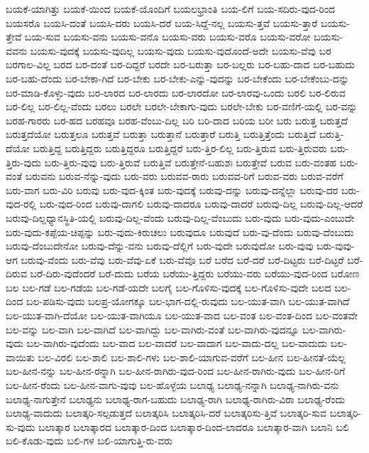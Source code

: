 {ಬಯಕೆ-ಯಾಗಿತ್ತು
ಬಯಕೆ-ಯಿಂದ
ಬಯಕೆ-ಯೊಂದಿಗೆ
ಬಯಲಭ್ರಾಂತಿ
ಬಯ-ಲಿಗೆ
ಬಯ-ಸದಿರು-ವುದ-ರಿಂದ
ಬಯಸರೊ
ಬಯಸಿ-ದಂತೆ
ಬಯಸಿ-ದರು
ಬಯಸಿ-ದರೆ
ಬಯ-ಸಿದ್ದೆ-ನಲ್ಲ
ಬಯಸು-ತ್ತವೆ
ಬಯಸು-ತ್ತಾರೆ
ಬಯಸು-ತ್ತೇವೆ
ಬಯ-ಸುವ
ಬಯಸು-ವನು
ಬಯಸು-ವನೊ
ಬಯಸು-ವರು
ಬಯಸು-ವರೊ
ಬಯಸು-ವರೋ
ಬಯಸು-ವವನು
ಬಯಸು-ವುದಕ್ಕೆ
ಬಯಸು-ವುದಿಲ್ಲ
ಬಯಸು-ವುದು
ಬಯಸು-ವುದೊಂದೆ-ಅದೇ
ಬಯಸು-ವೆವು
ಬರ
ಬರಗಾಲ-ವಿಲ್ಲ
ಬರದ
ಬರ-ದಂತೆ
ಬರ-ದಿದ್ದರೆ
ಬರದೇ
ಬರ-ಬರುತ್ತಾ
ಬರ-ಬಲ್ಲರು
ಬರ-ಬಹು-ದಾದ
ಬರ-ಬಹುದು
ಬರ-ಬಹು-ದೆಂದು
ಬರ-ಬೇಕಾ-ಗಿದೆ
ಬರ-ಬೇಕು
ಬರ-ಬೇಕು-ಎನ್ನು-ವುದನ್ನು
ಬರ-ಬೇಕೆಂದು
ಬರ-ಬೇಕೆಂಬು-ದನ್ನು
ಬರ-ಮಾಡಿ-ಕೊಳ್ಳು-ವುದು
ಬರ-ಲಾರದ
ಬರ-ಲಾರದು
ಬರ-ಲಾರದೋ
ಬರ-ಲಾರವು-ಒಂದು
ಬರಲಿ
ಬರ-ಲಿರುವ
ಬರ-ಲಿಲ್ಲ
ಬರ-ಲಿಲ್ಲ-ವೆಂದು
ಬರಲು
ಬರಲೇ
ಬರಲೇ-ಬೇಕಾಗು-ವುದು
ಬರಲೇ-ಬೇಕು
ಬರ-ವಣಿಗೆ-ಯಲ್ಲಿ
ಬರ-ವನ್ನು
ಬರಹ-ಗಾರರು
ಬರ-ಹದ
ಬರಹವೂ
ಬರಹ-ವೆಂಬು-ದಿಲ್ಲ
ಬರಿ
ಬರಿ-ದಾದ
ಬರಿಯ
ಬರೀ
ಬರು
ಬರುತ್ತ
ಬರುತ್ತದೆ
ಬರುತ್ತದೆಯೋ
ಬರುತ್ತಲೂ
ಬರುತ್ತವೆ
ಬರುತ್ತಾ
ಬರುತ್ತಾನೆ
ಬರುತ್ತಾರೆ
ಬರುತ್ತಿ
ಬರುತ್ತಿತ್ತೆಂದು
ಬರುತ್ತಿದೆ
ಬರುತ್ತಿ-ದೆಯೋ
ಬರುತ್ತಿದ್ದ
ಬರುತ್ತಿದ್ದರು
ಬರುತ್ತಿದ್ದರೂ
ಬರುತ್ತಿದ್ದರೆ
ಬರು-ತ್ತಿರ-ಲಿಲ್ಲ
ಬರು-ತ್ತಿರುವ
ಬರು-ತ್ತಿರುವರು
ಬರು-ತ್ತಿರು-ವುದು
ಬರು-ತ್ತಿರು-ವುವು
ಬರು-ತ್ತಿರುವೆ
ಬರುತ್ತಿವೆ
ಬರುತ್ತೇನೆ-ಬಹುಶಃ
ಬರುತ್ತೇವೆ
ಬರುವ
ಬರು-ವಂತಹ
ಬರು-ವಂತೆ
ಬರುವನು
ಬರುವ-ನೆನ್ನು-ವುದು
ಬರು-ವರು
ಬರುವವ-ರಾರು
ಬರುವವ-ರಿಗೆ
ಬರುವ-ವರು
ಬರುವ-ವರೆಗೆ
ಬರು-ವಾಗ
ಬರು-ವಿರಿ
ಬರುವು
ಬರು-ವುದ-ಕ್ಕಿಂತ
ಬರು-ವುದಕ್ಕೆ
ಬರುವು-ದನ್ನು
ಬರುವು-ದನ್ನೆಲ್ಲಾ
ಬರುವು-ದರ
ಬರು-ವುದ-ರಲ್ಲಿ
ಬರು-ವುದ-ರಿಂದ
ಬರುವು-ದಾಗಲಿ
ಬರುವು-ದಾದರೂ
ಬರುವು-ದಾದರೆ
ಬರುವು-ದಿಲ್ಲ
ಬರುವು-ದಿಲ್ಲ-ಆದರೆ
ಬರುವು-ದಿಲ್ಲಧ್ಯಾನಸ್ಥಿತಿ-ಯಲ್ಲಿ
ಬರುವು-ದಿಲ್ಲ-ವೆಂದು
ಬರುವು-ದಿಲ್ಲ-ವೆಂಬುದು
ಬರು-ವುದು
ಬರು-ವುದು-ಎಂಬುದೇ
ಬರು-ವುದು-ಕಪ್ಪೆಯ-ಚಿಪ್ಪನ್ನು
ಬರು-ವುದು-ಕಿರುಚಲು
ಬರುವುದೂ
ಬರುವುದೆ
ಬರು-ವು-ದೆಂದು
ಬರುವು-ದೆಂಬುದು
ಬರುವು-ದೆಂಬುದೇನೋ
ಬರುವು-ದೆನ್ನು-ವನು
ಬರುವು-ದೆಲ್ಲಿಗೆ
ಬರು-ವುದೇ
ಬರುವುದೋ
ಬರು-ವುವು
ಬರು-ವುವು-ಆಗ
ಬರುವು-ವೆಂದು
ಬರು-ವೆವು
ಬರು-ವೆವು-ಏಕೆ
ಬರು-ವೆವೊ
ಬರೆ
ಬರೆದ
ಬರೆ-ದರೆ
ಬರೆ-ದಿಟ್ಟರು
ಬರೆ-ದಿಟ್ಟರೆ
ಬರೆ-ದಿರುವ
ಬರೆ-ದಿರು-ವುದೆಂದರೆ
ಬರೆ-ದುದು
ಬರೆಯ
ಬರೆಯು-ತ್ತಿದ್ದರು
ಬರೆಯು-ವರು
ಬರೆಯು-ವುದ-ರಿಂದ
ಬರೋಣ
ಬಲ
ಬಲ-ಗಡೆ
ಬಲ-ಗಡೆಯ
ಬಲ-ಗಡೆ-ಯದೇ
ಬಲಗೈ
ಬಲ-ಗೊಳಿಸು-ವುದಕ್ಕೆ
ಬಲ-ಗೊಳಿಸು-ವುದೇ
ಬಲದ
ಬಲ-ದಿಂದ
ಬಲ-ಪಡಿಸು-ವುದು
ಬಲಪ್ರ-ಯೋಗಕ್ಕೂ
ಬಲ-ಭಾಗ-ದಲ್ಲಿ-ರುವುದು
ಬಲ-ಯುತ-ವಾಗಿ
ಬಲ-ಯುತ-ವಾಗಿದೆ
ಬಲ-ಯುತ-ವಾಗಿ-ದೆಯೋ
ಬಲ-ಯುತ-ವಾಗಿಯೂ
ಬಲ-ಯುತ-ವಾದ
ಬಲ-ವಂತ
ಬಲ-ವಂತ-ದಿಂದ
ಬಲ-ವಂತವೇ
ಬಲ-ವನ್ನು
ಬಲ-ವಾಗಿ
ಬಲ-ವಾಗಿದೆ
ಬಲ-ವಾಗಿದ್ದು
ಬಲ-ವಾಗಿರು-ವಂತೆ
ಬಲ-ವಾಗಿರು-ವುದನ್ನೂ
ಬಲ-ವಾಗಿರು-ವುದು
ಬಲ-ವಾಗಿರು-ವುದೆಂದು
ಬಲ-ವಾದ
ಬಲ-ವಾದರೆ
ಬಲ-ವಾದಾಗ
ಬಲ-ವಾದು-ದಲ್ಲ
ಬಲ-ವಾದುದು
ಬಲ-ವಾಯಿತು
ಬಲ-ವಿರಲಿ
ಬಲ-ಶಾಲಿ
ಬಲ-ಶಾಲಿ-ಗಳು
ಬಲ-ಶಾಲಿ-ಯಾಗುವ-ವರೆಗೆ
ಬಲ-ಹೀನ
ಬಲ-ಹೀನತೆ-ಯೆಲ್ಲ
ಬಲ-ಹೀನ-ನನ್ನು
ಬಲ-ಹೀನ-ರನ್ನಾಗಿ
ಬಲ-ಹೀನ-ರಾಗಿರು-ವುದ-ರಿಂದ
ಬಲ-ಹೀನ-ರಾಗಿರು-ವುದು
ಬಲ-ಹೀನ-ರಿಗೆ
ಬಲ-ಹೀನ-ರೆಂದು
ಬಲ-ಹೀನ-ವಾಗು-ವುವು
ಬಲ-ಹೊಳ್ಳೆಯ
ಬಲಾಢ್ಯ
ಬಲಾಢ್ಯ-ನನ್ನಾಗಿ
ಬಲಾಢ್ಯ-ನಾಗಿರು-ವನು
ಬಲಾಢ್ಯ-ನಾಗುತ್ತೇನೆ
ಬಲಾಢ್ಯನು
ಬಲಾಢ್ಯ-ರಾಗ-ಬಹುದು
ಬಲಾಢ್ಯ-ರಾಗಿ
ಬಲಾಢ್ಯ-ರಾಗಿರು-ವಿರಾ
ಬಲಾಢ್ಯ-ರೆಂದು
ಬಲಾಢ್ಯ-ವಾದುದು
ಬಲಾತ್ಕರಿ-ಸಲ್ಪಡುತ್ತದೆ
ಬಲಾತ್ಕರಿಸಿ
ಬಲಾತ್ಕರಿಸಿ-ದರೆ
ಬಲಾತ್ಕರಿಸು-ತ್ತಿವೆ
ಬಲಾತ್ಕರಿ-ಸುವ
ಬಲಾತ್ಕರಿ-ಸು-ವುದು
ಬಲಾತ್ಕಾರ
ಬಲಾತ್ಕಾರದ
ಬಲಾತ್ಕಾರ-ದಿಂದ
ಬಲಾತ್ಕಾರ-ದಿಂದ-ಲಾದರೂ
ಬಲಾತ್ಕಾರ-ವಾಗಿ
ಬಲಾನಿ
ಬಲಿ
ಬಲಿ-ಕೊಡು-ವುದು
ಬಲಿ-ಗಳ
ಬಲಿ-ಯಾಗುತ್ತಿ-ರು-ವರು
}

